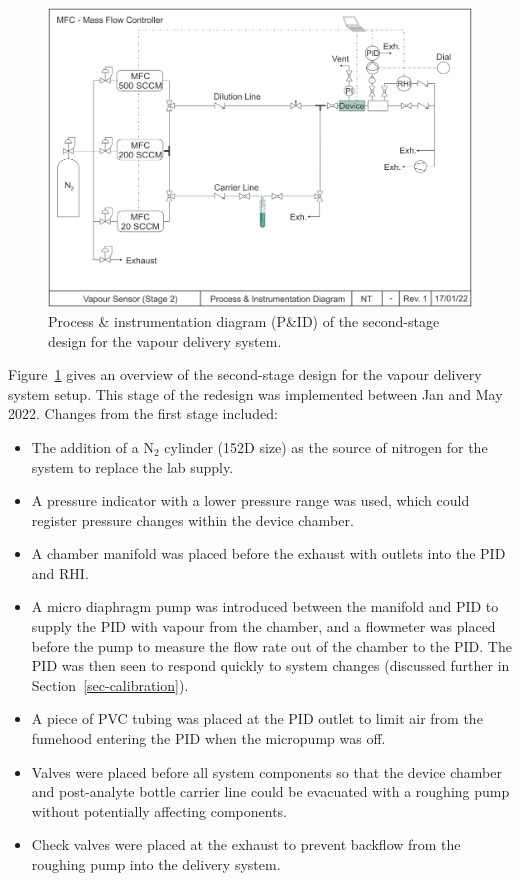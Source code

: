 \documentclass[
  a4paper,
]{scrbook}
\begin{document}
\begin{figure}

{\centering \includegraphics[width=1\textwidth,height=\textheight]{figures/ch5/PID_V2.png}

}

\caption{\label{fig-stage-2-pid}Process \& instrumentation diagram
(P\&ID) of the second-stage design for the vapour delivery system.}

\end{figure}

Figure~\ref{fig-stage-2-pid} gives an overview of the second-stage
design for the vapour delivery system setup. This stage of the redesign
was implemented between Jan and May 2022. Changes from the first stage
included:

\begin{itemize}
\item
  The addition of a N\(_2\) cylinder (152D size) as the source of
  nitrogen for the system to replace the lab supply.
\item
  A pressure indicator with a lower pressure range was used, which could
  register pressure changes within the device chamber.
\item
  A chamber manifold was placed before the exhaust with outlets into the
  PID and RHI.
\item
  A micro diaphragm pump was introduced between the manifold and PID to
  supply the PID with vapour from the chamber, and a flowmeter was
  placed before the pump to measure the flow rate out of the chamber to
  the PID. The PID was then seen to respond quickly to system changes
  (discussed further in Section~\ref{sec-calibration}).
\item
  A piece of PVC tubing was placed at the PID outlet to limit air from
  the fumehood entering the PID when the micropump was off.
\item
  Valves were placed before all system components so that the device
  chamber and post-analyte bottle carrier line could be evacuated with a
  roughing pump without potentially affecting components.
\item
  Check valves were placed at the exhaust to prevent backflow from the
  roughing pump into the delivery system.
\end{itemize}
\end{document}
